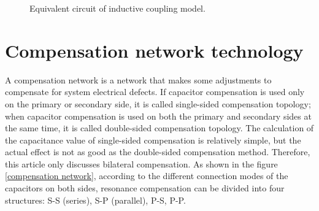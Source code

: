 \begin{figure}
    \centering
        \caption{Equivalent circuit of inductive coupling model.}
        \label{equivalent circuit}
\end{figure}

\section{Compensation network technology}
A compensation network is a network that makes some adjustments to compensate for system electrical defects. If capacitor compensation is used only on the primary or secondary side, it is called single-sided compensation topology; when capacitor compensation is used on both the primary and secondary sides at the same time, it is called double-sided compensation topology. The calculation of the capacitance value of single-sided compensation is relatively simple, but the actual effect is not as good as the double-sided compensation method. Therefore, this article only discusses bilateral compensation. As shown in the figure \ref{compensation network}, according to the different connection modes of the capacitors on both sides, resonance compensation can be divided into four structures: S-S (series), S-P (parallel), P-S, P-P.

